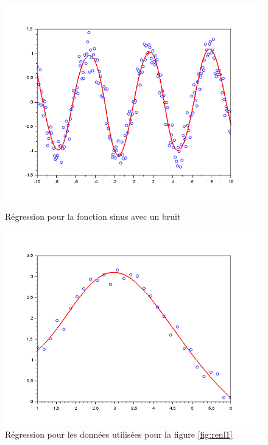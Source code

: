         \begin{figure}[H]
        \centering
        \begin{minipage}[H]{0.48\textwidth}
            \includegraphics[width=\textwidth]{images/rdn_sin.png}
            \caption{Régression pour la fonction sinus avec un bruit}
        \end{minipage}
        \hfill
        \begin{minipage}[H]{0.48\textwidth}
            \includegraphics[width=\textwidth]{images/rdn_gauss.png}
            \caption{Régression pour les données utilisées pour la figure \ref{fig:renl1}}
        \end{minipage}
    \end{figure}
